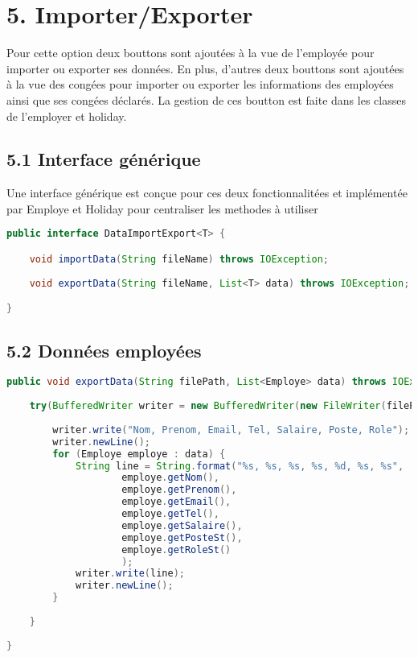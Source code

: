 \documentclass[a4paper,12pt]{report}
\begin{document}
\section*{\textcolor{myblue}{5. Importer/Exporter}}
Pour cette option deux bouttons sont ajoutées à la vue de l'employée pour importer ou exporter ses données. En plus, d'autres 
deux bouttons sont ajoutées à la vue des congées pour importer ou exporter les informations des employées ainsi que ses congées déclarés.
La gestion de ces boutton est faite dans les classes de l'employer et holiday.
\subsection{\textcolor{mygreen}{5.1 Interface générique}}
Une interface générique est conçue pour ces deux fonctionnalitées et implémentée par Employe et Holiday pour centraliser les methodes à utiliser
\begin{lstlisting}[language=java, caption={Le corps de l'interface}]
public interface DataImportExport<T> {

    void importData(String fileName) throws IOException;
    
    void exportData(String fileName, List<T> data) throws IOException;

}
\end{lstlisting}
\subsection{\textcolor{mygreen}{5.2 Données employées}}
\begin{lstlisting}[language=java, caption={le methode pour exporter les données des employées}]
public void exportData(String filePath, List<Employe> data) throws IOException {
    
    try(BufferedWriter writer = new BufferedWriter(new FileWriter(filePath))) {
        
        writer.write("Nom, Prenom, Email, Tel, Salaire, Poste, Role");
        writer.newLine();
        for (Employe employe : data) {
            String line = String.format("%s, %s, %s, %s, %d, %s, %s",
                    employe.getNom(),
                    employe.getPrenom(),
                    employe.getEmail(),
                    employe.getTel(),
                    employe.getSalaire(),
                    employe.getPosteSt(),
                    employe.getRoleSt()
                    );
            writer.write(line);
            writer.newLine();
        }
        
    } 
    
}
\end{lstlisting} 
\end{document}
